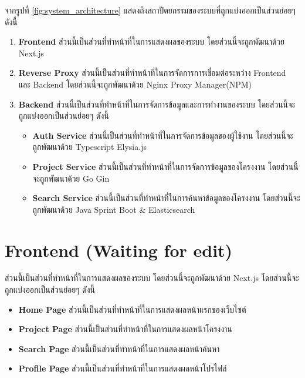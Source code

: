 จากรูปที่ \ref{fig:system_architecture} แสดงถึงสถาปัตยกรรมของระบบที่ถูกแบ่งออกเป็นส่วนย่อยๆ ดังนี้
\begin{enumerate}
  \item  \textbf{Frontend} ส่วนนี้เป็นส่วนที่ทำหน้าที่ในการแสดงผลของระบบ โดยส่วนนี้จะถูกพัฒนาด้วย Next.js
  \item \textbf{Reverse Proxy} ส่วนนี้เป็นส่วนที่ทำหน้าที่ในการจัดการการเชื่อมต่อระหว่าง Frontend และ Backend โดยส่วนนี้จะถูกพัฒนาด้วย Nginx Proxy Manager(NPM)
  \item \textbf{Backend} ส่วนนี้เป็นส่วนที่ทำหน้าที่ในการจัดการข้อมูลและการทำงานของระบบ โดยส่วนนี้จะถูกแบ่งออกเป็นส่วนย่อยๆ ดังนี้
  \begin{itemize}
    \item \textbf{Auth Service} ส่วนนี้เป็นส่วนที่ทำหน้าที่ในการจัดการข้อมูลของผู้ใช้งาน โดยส่วนนี้จะถูกพัฒนาด้วย Typescript Elysia.js 
    \item \textbf{Project Service} ส่วนนี้เป็นส่วนที่ทำหน้าที่ในการจัดการข้อมูลของโครงงาน โดยส่วนนี้จะถูกพัฒนาด้วย Go Gin 
    \item \textbf{Search Service} ส่วนนี้เป็นส่วนที่ทำหน้าที่ในการค้นหาข้อมูลของโครงงาน โดยส่วนนี้จะถูกพัฒนาด้วย Java Sprint Boot \& Elasticsearch
  \end{itemize}
\end{enumerate}

\section{Frontend (Waiting for edit)}
\hspace{1.27cm} \raggedright ส่วนนี้เป็นส่วนที่ทำหน้าที่ในการแสดงผลของระบบ โดยส่วนนี้จะถูกพัฒนาด้วย Next.js โดยส่วนนี้จะถูกแบ่งออกเป็นส่วนย่อยๆ ดังนี้
\begin{itemize}
  \item \textbf{Home Page} ส่วนนี้เป็นส่วนที่ทำหน้าที่ในการแสดงผลหน้าแรกของเว็บไซต์
  \item \textbf{Project Page} ส่วนนี้เป็นส่วนที่ทำหน้าที่ในการแสดงผลหน้าโครงงาน
  \item \textbf{Search Page} ส่วนนี้เป็นส่วนที่ทำหน้าที่ในการแสดงผลหน้าค้นหา
  \item \textbf{Profile Page} ส่วนนี้เป็นส่วนที่ทำหน้าที่ในการแสดงผลหน้าโปรไฟล์
  \end{itemize}

